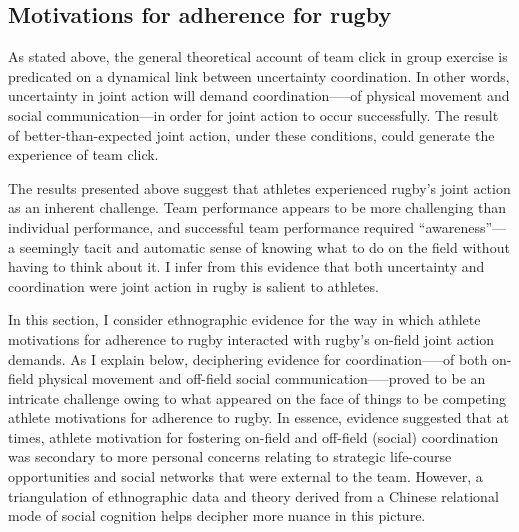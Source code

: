 \begin{CJK}{UTF8}{gbsn}










\section{Motivations for adherence for rugby}
As stated above, the general theoretical account of team click in group exercise is predicated on a dynamical link between uncertainty coordination.  In other words, uncertainty in joint action will demand coordination—--of physical movement and social communication---in order for joint action to occur successfully.  The result of better-than-expected joint action, under these conditions, could generate the experience of team click.

The results presented above suggest that athletes experienced rugby's joint action as an inherent challenge.  Team performance appears to be more challenging than individual performance, and successful team performance required ``awareness''---a seemingly tacit and automatic sense of knowing what to do on the field without having to think about it.  I infer from this evidence that both uncertainty and coordination were joint action in rugby is salient to athletes.

In this section, I consider ethnographic evidence for the way in which athlete motivations for adherence to rugby interacted with rugby's on-field joint action demands.  As I explain below, deciphering evidence for coordination—--of both on-field physical movement and off-field social communication—--proved to be an intricate challenge owing to what appeared on the face of things to be competing athlete motivations for adherence to rugby.   In essence, evidence suggested that at times, athlete motivation for fostering on-field and off-field (social) coordination was secondary to more personal concerns relating to strategic life-course opportunities and social networks that were external to the team.  However, a triangulation of ethnographic data and theory derived from a Chinese relational mode of social cognition helps decipher more nuance in this picture.


\end{CJK}
